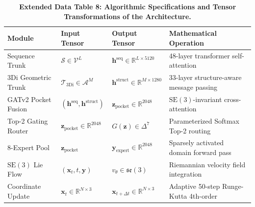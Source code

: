\begin{table}[h!]
\caption{\textbf{Extended Data Table 8: Algorithmic Specifications and Tensor Transformations of the Architecture.}}
\label{tab:ed_tensors}
\centering
\small
\begin{tabular}{lllp{5.5cm}}
\toprule
\textbf{Module} & \textbf{Input Tensor} & \textbf{Output Tensor} & \textbf{Mathematical Operation} \\
\midrule
Sequence Trunk & $\mathcal{S} \in \mathcal{V}^L$ & $\mathbf{h}^{\text{seq}} \in \mathbb{R}^{L \times 5120}$ & 48-layer transformer self-attention \\
3Di Geometric Trunk & $\mathcal{T}_{\text{3Di}} \in \mathcal{A}^M$ & $\mathbf{h}^{\text{struct}} \in \mathbb{R}^{M \times 1280}$ & 33-layer structure-aware message passing \\
GATv2 Pocket Fusion & $(\mathbf{h}^{\text{seq}}, \mathbf{h}^{\text{struct}})$ & $\mathbf{z}_{\text{pocket}} \in \mathbb{R}^{2048}$ & $\mathrm{SE}(3)$-invariant cross-attention \\
Top-2 Gating Router & $\mathbf{z}_{\text{pocket}} \in \mathbb{R}^{2048}$ & $G(\mathbf{z}) \in \Delta^7$ & Parameterized Softmax Top-2 routing \\
8-Expert Pool & $\mathbf{z}_{\text{pocket}}$ & $\mathbf{y}_{\text{expert}} \in \mathbb{R}^{2048}$ & Sparsely activated domain forward pass \\
$\mathrm{SE}(3)$ Lie Flow & $(\mathbf{x}_t, t, \mathbf{y})$ & $v_\theta \in \mathfrak{se}(3)$ & Riemannian velocity field integration \\
Coordinate Update & $\mathbf{x}_t \in \mathbb{R}^{N \times 3}$ & $\mathbf{x}_{t+\Delta t} \in \mathbb{R}^{N \times 3}$ & Adaptive 50-step Runge-Kutta 4th-order \\
\bottomrule
\end{tabular}
\end{table}

\vspace{1em}

